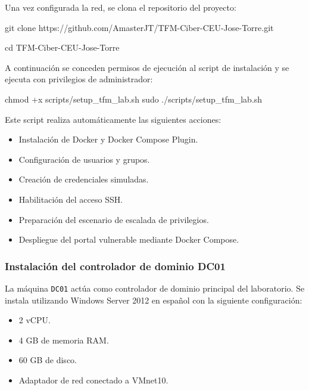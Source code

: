 
Una vez configurada la red, se clona el repositorio del proyecto:

\begin{bashbox}
git clone https://github.com/AmasterJT/TFM-Ciber-CEU-Jose-Torre.git

cd TFM-Ciber-CEU-Jose-Torre
\end{bashbox}


A continuación se conceden permisos de ejecución al script de instalación y se ejecuta con privilegios de administrador:

\begin{bashbox}
chmod +x scripts/setup_tfm_lab.sh
sudo ./scripts/setup_tfm_lab.sh
\end{bashbox}

Este script realiza automáticamente las siguientes acciones:

\begin{itemize}
    \item Instalación de Docker y Docker Compose Plugin.
    \item Configuración de usuarios y grupos.
    \item Creación de credenciales simuladas.
    \item Habilitación del acceso SSH.
    \item Preparación del escenario de escalada de privilegios.
    \item Despliegue del portal vulnerable mediante Docker Compose.
\end{itemize}

\subsubsection*{Instalación del controlador de dominio DC01}

La máquina \texttt{DC01} actúa como controlador de dominio principal del laboratorio. Se instala utilizando Windows Server 2012 en español con la siguiente configuración:

\begin{itemize}
    \item 2 vCPU.
    \item 4 GB de memoria RAM.
    \item 60 GB de disco.
    \item Adaptador de red conectado a VMnet10.
\end{itemize}

